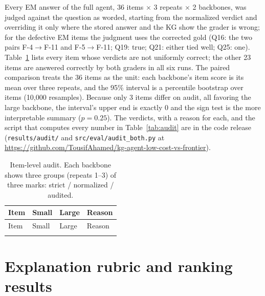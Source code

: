 \documentclass{article}
\begin{document}
Every EM answer of the full agent, 36 items $\times$ 3 repeats $\times$ 2
backbones, was judged against the question as worded, starting from the
normalized verdict and overriding it only where the stored answer and the KG
show the grader is wrong; for the defective EM items the judgment uses the
corrected gold (Q16: the two pairs F-4$\to$F-11 and F-5$\to$F-11; Q19: true;
Q21: either tied well; Q25: one). Table~\ref{tab:auditrows} lists every item
whose verdicts are not uniformly correct; the other 23 items are answered
correctly by both graders in all six runs. The paired comparison treats the 36
items as the unit: each backbone's item score is its mean over three repeats,
and the 95\% interval is a percentile bootstrap over items (10{,}000
resamples). Because only 3 items differ on audit, all favoring the large
backbone, the interval's upper end is exactly 0 and the sign test is the more
interpretable summary ($p=0.25$). The verdicts, with a reason for each, and the
script that computes every number in Table~\ref{tab:audit} are in the code
release (\texttt{results/audit/} and \texttt{src/eval/audit\_both.py} at
\url{https://github.com/TousifAhamed/kg-agent-low-cost-vs-frontier}).

{\footnotesize
\setlength{\tabcolsep}{4pt}
\begin{longtable}{@{}l>{\raggedright\arraybackslash}p{}%
>{\raggedright\arraybackslash}p{}%
>{\raggedright\arraybackslash}p{}@{}}
\caption{Item-level audit. Each backbone shows three groups (repeats 1--3) of
three marks: strict / normalized / audited.}
\label{tab:auditrows}\\
\toprule
Item & Small & Large & Reason \\
\midrule
\endfirsthead
\toprule
Item & Small & Large & Reason \\
\midrule
\endhead
\bottomrule
\endfoot

\end{longtable}
}

\section{Explanation rubric and ranking results}
\label{app:explanation}
\end{document}
